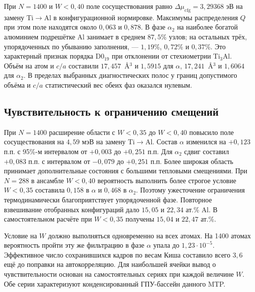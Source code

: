 \documentclass[11pt,a4paper]{article}
\begin{document}
При $N=1400$ и $W<0{,}40$ поле сосуществования равно
$\Delta\mu_{\mathrm{cfg}}=3{,}29368$ эВ на замену Ti$\to$Al
в конфигурационной нормировке. Максимумы распределения $Q$ при
этом поле находятся около $0{,}063$ и $0{,}878$. В фазе $\alpha_2$
на наиболее богатой алюминием подрешётке Al занимает в среднем
$87{,}5\%$ узлов; на остальных трёх, упорядоченных по убыванию
заполнения, --- $1{,}19\%$, $0{,}72\%$ и $0{,}37\%$.
Это характерный признак порядка D0$_{19}$ при отклонении от
стехиометрии Ti$_3$Al. Объём на атом и $c/a$ составили
$17{,}457$~\AA$^3$ и $1{,}5915$ для $\alpha$, $17{,}241$~\AA$^3$
и $1{,}6064$ для $\alpha_2$. В пределах выбранных диагностических
полос у границ допустимого объёма и $c/a$ статистический вес обеих
фаз оказался нулевым.

\subsection{Чувствительность к ограничению смещений}

При $N=1400$ расширение области с $W<0{,}35$ до $W<0{,}40$
повысило поле сосуществования на $4{,}59$ мэВ на замену
Ti$\to$Al. Состав $\alpha$ изменился на $+0{,}123$ п.п.
с 95\%-м интервалом от $+0{,}003$ до $+0{,}251$ п.п.
Для $\alpha_2$ сдвиг составил $+0{,}083$ п.п. с интервалом
от $-0{,}079$ до $+0{,}251$ п.п.
Более широкая область принимает дополнительные состояния с
большими тепловыми смещениями. При $N=288$ в ансамбле $W<0{,}40$
вероятность выполнить более строгое условие $W<0{,}35$ составила
$0{,}158$ в $\alpha$ и $0{,}468$ в $\alpha_2$. Поэтому ужесточение
ограничения термодинамически благоприятствует упорядоченной фазе.
Повторное взвешивание отобранных конфигураций дало
$15{,}05$ и $22{,}34$ ат.\% Al. В самостоятельном расчёте
при $W<0{,}35$ получены $15{,}04$ и $22{,}47$ ат.\%.

Условие на $W$ должно выполняться одновременно на всех атомах.
На 1400 атомах вероятность пройти эту же фильтрацию в фазе $\alpha$
упала до $1{,}23\cdot10^{-5}$. Эффективное число сохранившихся
кадров по весам Киша составило всего $3{,}6$ ещё до поправки на
автокорреляцию. Для наибольшей ячейки вывод о чувствительности
основан на самостоятельных сериях при каждой величине $W$.
Обе серии характеризуют конденсированный ГПУ-бассейн данного MTP.
\end{document}
